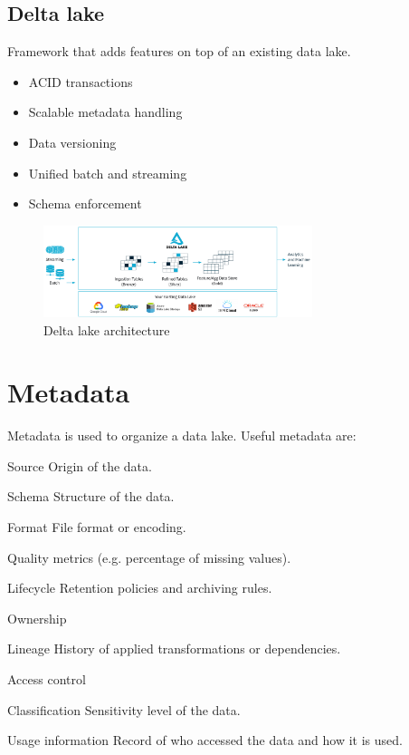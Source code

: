 \subsection{Delta lake} 
Framework that adds features on top of an existing data lake.
\begin{itemize}
    \item ACID transactions
    \item Scalable metadata handling
    \item Data versioning
    \item Unified batch and streaming
    \item Schema enforcement
\end{itemize}
\begin{figure}[ht]
    \centering
    \includegraphics[width=0.7\textwidth]{img/delta_lake.png}
    \caption{Delta lake architecture}
\end{figure}


\section{Metadata}
Metadata is used to organize a data lake.
Useful metadata are:
\begin{descriptionlist}
    \item[Source] Origin of the data.
    \item[Schema] Structure of the data.
    \item[Format] File format or encoding.
    \item[Quality metrics] (e.g. percentage of missing values).
    \item[Lifecycle] Retention policies and archiving rules.
    \item[Ownership] 
    \item[Lineage] History of applied transformations or dependencies.
    \item[Access control] 
    \item[Classification] Sensitivity level of the data.
    \item[Usage information] Record of who accessed the data and how it is used.
\end{descriptionlist}